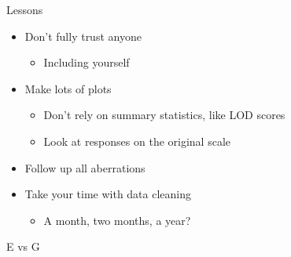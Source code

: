 \documentclass[12pt,t]{beamer}
\begin{document}
\begin{frame}[c]{Lessons}

\begin{itemize}
\itemsep12pt

\item Don't fully trust anyone
\begin{itemize}
\item Including yourself
\end{itemize}

\item Make lots of plots
\begin{itemize}
\item Don't rely on summary statistics, like LOD scores
\item Look at responses on the original scale
\end{itemize}

\item Follow up all aberrations

\item Take your time with data cleaning
\begin{itemize}
\item A month, two months, a year?
\end{itemize}

\end{itemize}
\note{}
\end{frame}


\begin{frame}[c]{E vs G}



\note{}
\end{frame}
\end{document}
